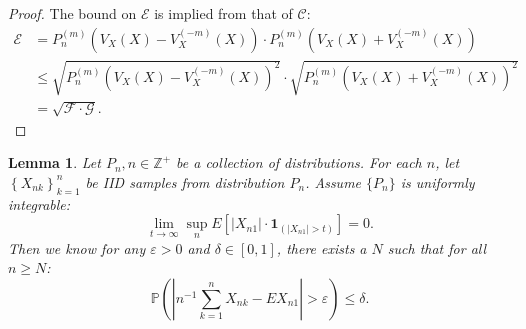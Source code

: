 \documentclass[11pt]{article}
\newtheorem{lemma}[theorem]{Lemma}
\begin{document}
\begin{proof}
The bound on $\mathcal{E}$ is implied from that of $\mathcal{C}$:
\begin{equation*}
\begin{aligned}
\mathcal{E}&=P_n^{(m)}\left(V_X(X)-V_X^{(-m)}(X)\right) \cdot P_n^{(m)}\left(V_X(X)+V_X^{(-m)}(X)\right) \\
&\leq \sqrt{P_n^{(m)}\left(V_X(X)-V_X^{(-m)}(X)\right)^2} \cdot \sqrt{P_n^{(m)}\left(V_X(X)+V_X^{(-m)}(X)\right)^2} \\
&=\sqrt{\mathcal{F} \cdot \mathcal{G}}.
\end{aligned}
\end{equation*}
\end{proof}

\begin{lemma}\label{lemma: triangular LLN}Let $P_n, n\in\mathbb{Z}^+$ be a collection of distributions. For each $n$, let $\left\{X_{n k}\right\}_{k=1}^n$ be IID samples from distribution $P_n$. Assume $\{P_n\}$ is uniformly integrable:
\begin{equation*}
\lim _{t \rightarrow \infty} \sup _n E\left[\left|X_{n 1}\right| \cdot \mathbf{1}_{(\left|X_{n 1}\right|>t)}\right]=0.
\end{equation*}
Then we know for any $\varepsilon>0$ and $\delta\in [0,1]$, there exists a $N$ such that for all $n \geq N$:
\begin{equation*}
\mathbb{P}\left(\left|
n^{-1} \sum_{k=1}^n X_{n k}-E X_{n1}
\right|>\varepsilon\right) \leq \delta .
\end{equation*}
\end{lemma}
\end{document}
